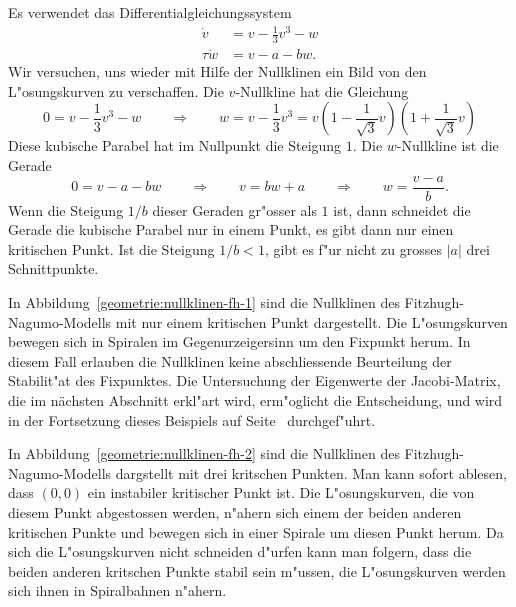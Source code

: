 \begin{beispiel}
\begin{figure}
\end{figure}
Es verwendet das Differentialgleichungssystem
\begin{equation}
\begin{aligned}
    \dot v&= v-\frac13v^3-w\\
\tau\dot w&= v-a-bw.
\end{aligned}
\label{geometrie:fitzhugh-dgl}
\end{equation}
Wir versuchen, uns wieder mit Hilfe der Nullklinen ein Bild von den
L"osungskurven zu verschaffen.
Die $v$-Nullkline hat die Gleichung
\[
0=v-\frac13v^3-w
\qquad\Rightarrow\qquad
w=v-\frac13v^3 = v(1-{\textstyle\frac1{\sqrt{3}}}v)(1+{\textstyle\frac1{\sqrt{3}}}v)
\]
Diese kubische Parabel hat im Nullpunkt die Steigung $1$.
Die $w$-Nullkline ist die Gerade
\[
0=v-a-bw
\qquad\Rightarrow\qquad
v=bw+a
\qquad\Rightarrow\qquad
w = \frac{v-a}{b}.
\]
Wenn die Steigung $1/b$ dieser Geraden gr"osser als $1$ ist, dann schneidet
die Gerade die kubische Parabel nur in einem Punkt, es gibt dann nur
einen kritischen Punkt.
Ist die Steigung $1/b<1$, gibt es f"ur nicht zu grosses $|a|$ drei
Schnittpunkte.

In Abbildung~\ref{geometrie:nullklinen-fh-1} sind die Nullklinen des
Fitzhugh-Nagumo-Modells mit nur einem kritischen Punkt dargestellt.
Die L"osungskurven bewegen sich in Spiralen im Gegenurzeigersinn
um den Fixpunkt herum.
In diesem Fall erlauben die Nullklinen keine abschliessende Beurteilung
der Stabilit"at des Fixpunktes.
Die Untersuchung der Eigenwerte der Jacobi-Matrix, die im nächsten
Abschnitt erkl"art wird, erm"oglicht die Entscheidung, und wird in
der Fortsetzung dieses Beispiels auf Seite~\pageref{geometrie:fh-fortsetzung}
durchgef"uhrt.

In Abbildung~\ref{geometrie:nullklinen-fh-2} sind die Nullklinen des
Fitzhugh-Nagumo-Modells dargstellt mit drei kritschen Punkten.
Man kann sofort ablesen, dass $(0,0)$ ein instabiler kritischer Punkt ist.
Die L"osungskurven, die von diesem Punkt abgestossen werden, n"ahern sich
einem der beiden anderen kritischen Punkte und bewegen sich
in einer Spirale um diesen Punkt herum.
Da sich die L"osungskurven nicht schneiden d"urfen kann man folgern,
dass die beiden anderen kritschen Punkte stabil sein m"ussen,
die L"osungskurven werden sich ihnen in Spiralbahnen n"ahern.
\label{geometrie:fh-diskussion}
\end{beispiel}

%
%
